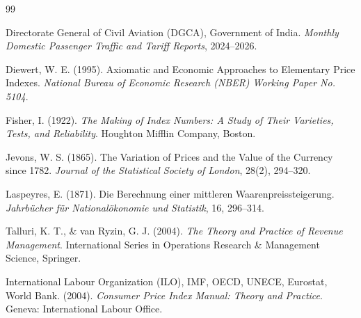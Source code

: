 \documentclass[11pt,a4paper]{article}
\begin{document}
\begin{thebibliography}{99}

Directorate General of Civil Aviation (DGCA), Government of India. 
\textit{Monthly Domestic Passenger Traffic and Tariff Reports}, 2024--2026.

Diewert, W. E. (1995). 
Axiomatic and Economic Approaches to Elementary Price Indexes. 
\textit{National Bureau of Economic Research (NBER) Working Paper No. 5104}.

Fisher, I. (1922). 
\textit{The Making of Index Numbers: A Study of Their Varieties, Tests, and Reliability}. 
Houghton Mifflin Company, Boston.

Jevons, W. S. (1865). 
The Variation of Prices and the Value of the Currency since 1782. 
\textit{Journal of the Statistical Society of London}, 28(2), 294--320.

Laspeyres, E. (1871). 
Die Berechnung einer mittleren Waarenpreissteigerung. 
\textit{Jahrb{\"u}cher f{\"u}r National{\"o}konomie und Statistik}, 16, 296--314.

Talluri, K. T., \& van Ryzin, G. J. (2004). 
\textit{The Theory and Practice of Revenue Management}. 
International Series in Operations Research \& Management Science, Springer.

International Labour Organization (ILO), IMF, OECD, UNECE, Eurostat, World Bank. (2004). 
\textit{Consumer Price Index Manual: Theory and Practice}. 
Geneva: International Labour Office.

\end{thebibliography}
\end{document}
